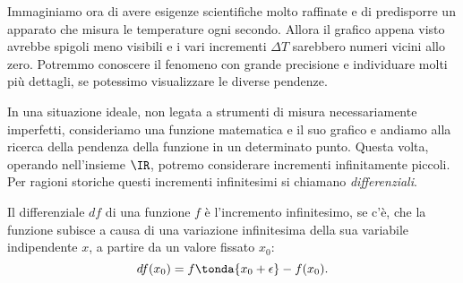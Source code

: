 \begin{minipage}{0.48\textwidth}
Immaginiamo ora di avere esigenze scientifiche molto raffinate e di 
predisporre un apparato che misura le temperature ogni secondo. 
Allora il grafico appena visto avrebbe spigoli meno visibili e i vari 
incrementi \(\Delta T\) sarebbero numeri vicini allo zero. 
Potremmo conoscere il fenomeno con grande precisione e individuare molti 
più dettagli, se potessimo visualizzare le diverse pendenze.
\end{minipage}
 \hfill
\begin{minipage}{.48 \textwidth}
 \begin{center}
 \temperatureb
\label{graf:temperatureb}
 \end{center}
\label{graf:temperature}
\end{minipage}



In una situazione ideale, non legata a strumenti di misura necessariamente 
imperfetti, consideriamo una funzione matematica e il suo grafico e andiamo 
alla ricerca della pendenza della funzione in un determinato punto. Questa 
volta, operando nell'insieme \(\IR\), potremo considerare incrementi 
infinitamente piccoli. Per ragioni storiche questi incrementi infinitesimi si
chiamano \emph{differenziali}.
\begin{definizione}
 Il differenziale \(df\) di una funzione \(f\) è l'incremento infinitesimo, se 
c'è, che la funzione subisce a causa di una variazione infinitesima della sua 
variabile indipendente \(x\), a partire da un valore fissato \(x_0\):
\[df(x_0) = f \tonda{x_0 + \epsilon} - f(x_0).\]
\end{definizione}

